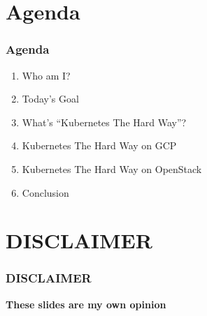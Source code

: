 \documentclass[aspectratio=169,11pt,hyperref={colorlinks=true}]{beamer}
\begin{document}
\section{Agenda}
\begin{frame}
  \frametitle{Agenda}
  \begin{enumerate}
    \item Who am I?
    \item Today's Goal
    \item What's ``Kubernetes The Hard Way''?
    \item Kubernetes The Hard Way on GCP
    \item Kubernetes The Hard Way on OpenStack
    \item Conclusion
  \end{enumerate}
\end{frame}

\section{DISCLAIMER}
\begin{frame}
  \frametitle{DISCLAIMER}
  \huge{\bf{These slides are my own opinion}}
\end{frame}
\end{document}
